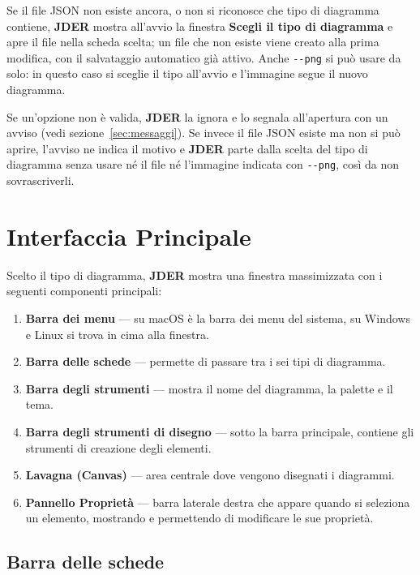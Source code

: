 \documentclass[a4paper,11pt]{article}
\newcommand{\uielement}[1]{\textbf{#1}}
\newcommand{\jder}{\textbf{JDER}}
\begin{document}
Se il file JSON non esiste ancora, o non si riconosce che tipo di diagramma contiene, \jder{}
mostra all'avvio la finestra \uielement{Scegli il tipo di diagramma} e apre il file nella scheda
scelta; un file che non esiste viene creato alla prima modifica, con il salvataggio automatico già
attivo. Anche \texttt{-{}-png} si può usare da solo: in questo caso si sceglie il tipo all'avvio e
l'immagine segue il nuovo diagramma.

Se un'opzione non è valida, \jder{} la ignora e lo segnala all'apertura con un avviso (vedi
sezione~\ref{sec:messaggi}). Se invece il file JSON esiste ma non si può aprire, l'avviso ne indica
il motivo e \jder{} parte dalla scelta del tipo di diagramma senza usare né il file né l'immagine
indicata con \texttt{-{}-png}, così da non sovrascriverli.

\section{Interfaccia Principale}
\label{sec:interfaccia}

Scelto il tipo di diagramma, \jder{} mostra una finestra massimizzata con i seguenti componenti
principali:

\begin{enumerate}
  \item \textbf{Barra dei menu} --- su macOS è la barra dei menu del sistema, su Windows e Linux si
        trova in cima alla finestra.
  \item \textbf{Barra delle schede} --- permette di passare tra i sei tipi di diagramma.
  \item \textbf{Barra degli strumenti} --- mostra il nome del diagramma, la palette e il tema.
  \item \textbf{Barra degli strumenti di disegno} --- sotto la barra principale, contiene gli
        strumenti di creazione degli elementi.
  \item \textbf{Lavagna (Canvas)} --- area centrale dove vengono disegnati i diagrammi.
  \item \textbf{Pannello Proprietà} --- barra laterale destra che appare quando si seleziona un
        elemento, mostrando e permettendo di modificare le sue proprietà.
\end{enumerate}

\subsection{Barra delle schede}
\end{document}

